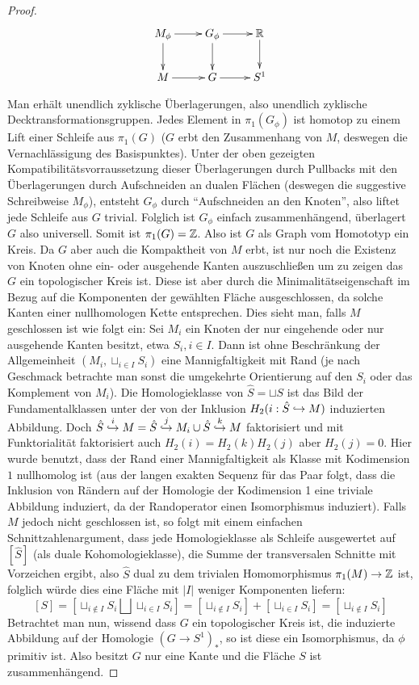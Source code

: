 \begin{proof}
	\[
	 	\begin{xy}
	 		\xymatrix{
	 			M_\phi \ar[r] \ar[d] & G_\phi \ar[d] \ar[r] & \RR \ar[d]\\
	 			M \ar[r] & G \ar[r] &S^1
	 		}
	 	\end{xy}
	 \] 

	 Man erhält unendlich zyklische Überlagerungen, also unendlich zyklische Decktransformationsgruppen. Jedes Element in $\pi_1(G_\phi)$ ist homotop zu einem Lift einer Schleife  aus $\pi_1(G)$ ($G$ erbt den Zusammenhang von $M$, deswegen die Vernachlässigung des Basispunktes). Unter der oben gezeigten Kompatibilitätsvorraussetzung dieser Überlagerungen durch Pullbacks mit den Überlagerungen durch Aufschneiden an dualen Flächen (deswegen die suggestive Schreibweise $M_\phi$), entsteht $G_\phi$ durch "`Aufschneiden an den Knoten"', also liftet jede Schleife aus $G$ trivial. Folglich ist $G_\phi$ einfach zusammenhängend, überlagert $G$ also universell. Somit ist $\pi_1(G)= \mathbb{Z}$. Also ist $G$ als Graph vom Homototyp ein Kreis. Da $G$ aber auch die Kompaktheit von $M$ erbt, ist nur noch die Existenz von Knoten ohne ein- oder ausgehende Kanten auszuschließen um zu zeigen das $G$ ein topologischer Kreis ist. Diese ist aber durch die Minimalitätseigenschaft im Bezug auf die Komponenten der gewählten Fläche ausgeschlossen, da solche Kanten einer nullhomologen Kette entsprechen. Dies sieht man, falls $M$ geschlossen ist wie folgt ein: Sei $M_i$ ein Knoten der nur eingehende oder nur ausgehende Kanten besitzt, etwa $S_i, i \in I$. Dann ist ohne Beschränkung der Allgemeinheit $(M_i,\sqcup_{i\in I}S_i)$ eine Mannigfaltigkeit mit Rand (je nach Geschmack betrachte man sonst die umgekehrte Orientierung auf den $S_i$ oder das Komplement von $M_i$). Die Homologieklasse von $\hat S = \sqcup S$ ist das Bild der Fundamentalklassen unter der von der Inklusion $H_2(i:\hat S \hookrightarrow M)$ induzierten Abbildung. Doch $ \hat S \stackrel i {\hookrightarrow} M = \hat S \stackrel j {\hookrightarrow} M_i \cup \hat S \stackrel k {\hookrightarrow} M$ faktorisiert und mit Funktorialität faktorisiert auch $H_2(i)=H_2(k)H_2(j)$ aber $H_2(j)=0$. Hier wurde benutzt, dass der Rand einer Mannigfaltigkeit als Klasse mit Kodimension $1$ nullhomolog ist (aus der langen exakten Sequenz für das Paar folgt, dass die Inklusion von Rändern auf der Homologie der Kodimension 1 eine triviale Abbildung induziert, da der Randoperator einen Isomorphismus induziert). Falls $M$ jedoch nicht geschlossen ist, so folgt mit einem einfachen Schnittzahlenargument, dass jede Homologieklasse als Schleife ausgewertet auf $[\hat S]$ (als duale Kohomologieklasse), die Summe der transversalen Schnitte mit Vorzeichen ergibt, also $\hat S$ dual zu dem trivialen Homomorphismus $\pi_1(M)\to \mathbb{Z}$ ist, folglich würde dies  eine Fläche mit $|I|$ weniger Komponenten liefern:
	 \[
	 	[S]=[\sqcup_{i\not \in I} S_i\bigsqcup \sqcup_{i\in I} S_i] = [\sqcup_{i\not \in I} S_i ]+[ \sqcup_{i\in I} S_i] = [\sqcup_{i\not \in I}S_i]
	 \]
	 Betrachtet man nun, wissend dass $G$ ein topologischer Kreis ist, die induzierte Abbildung auf der Homologie $(G\to S^1)_*$, so ist diese ein Isomorphismus, da $\phi$ primitiv ist. Also besitzt $G$ nur eine Kante und die Fläche $S$ ist zusammenhängend.


\end{proof}
